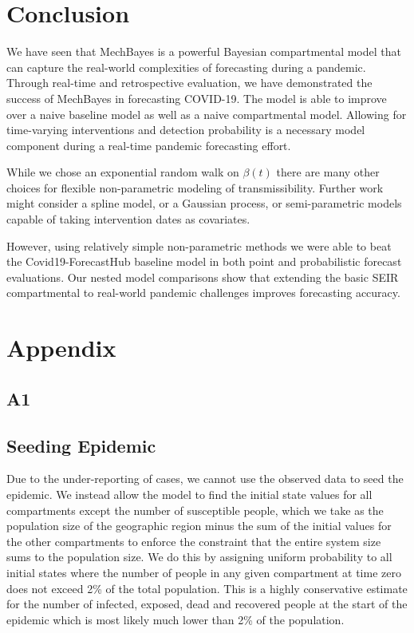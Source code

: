 \documentclass[11pt]{amsart}
\begin{document}
\section{Conclusion}

We have seen that MechBayes is a powerful Bayesian compartmental model that can capture the real-world complexities of forecasting during a pandemic. Through real-time and retrospective evaluation, we have demonstrated the success of MechBayes in forecasting COVID-19. The model is able to improve over a naive baseline model as well as a naive compartmental model. Allowing for time-varying interventions and detection probability is a necessary model component during a real-time pandemic forecasting effort. 

While we chose an exponential random walk on $\beta(t)$ there are many other choices for flexible non-parametric modeling of transmissibility. Further work might consider a spline model, or a Gaussian process, or semi-parametric models capable of taking intervention dates as covariates. 

However, using relatively simple non-parametric methods we were able to beat the Covid19-ForecastHub baseline model in both point and probabilistic forecast evaluations. Our nested model comparisons show that extending the basic SEIR compartmental to real-world pandemic challenges improves forecasting accuracy. 


\newpage

\section{Appendix}
\subsection{A1}
\subsection{Seeding Epidemic}
Due to the under-reporting of cases, we cannot use the observed data to seed the epidemic. We instead allow the model to find the initial state values for all compartments except the number of susceptible people, which we take as the population size of the geographic region minus the sum of the initial values for the other compartments to enforce the constraint that the entire system size sums to the population size. We do this by assigning uniform probability to all initial states where the number of people in any given compartment at time zero does not exceed 2\% of the total population. This is a highly conservative estimate for the number of infected, exposed, dead and recovered people at the start of the epidemic which is most likely much lower than 2\% of the population. 
\end{document}
